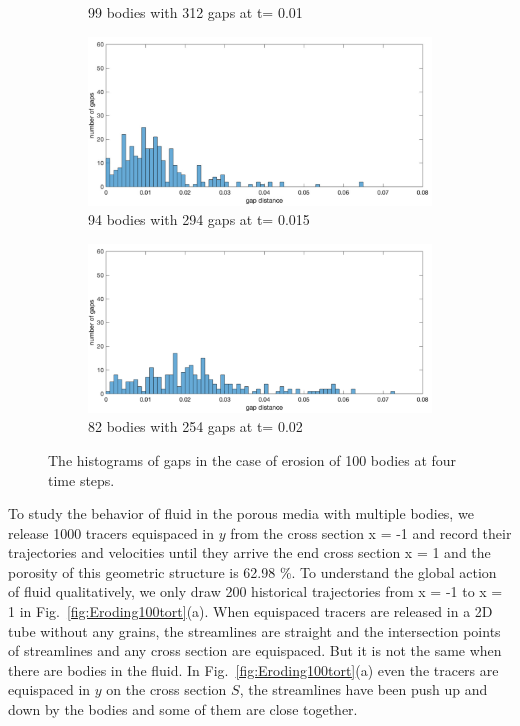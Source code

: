 \documentclass[preprint, 10pt]{elsarticle}
\begin{document}
{\begin{figure}[H]
\begin{subfigure}[b]{0.5\textwidth}
\caption{99 bodies with 312 gaps at t= 0.01}
\end{subfigure}
\begin{subfigure}[b]{0.5\textwidth}
\includegraphics*[width =\linewidth]{./figs/gap_hist100_150}
\caption{94 bodies with 294 gaps at t= 0.015}
\end{subfigure}%
\begin{subfigure}[b]{0.5\textwidth}
\includegraphics*[width =\linewidth]{./figs/gap_hist100_200}
\caption{82 bodies with 254 gaps at t= 0.02}
\end{subfigure}
\caption{\label{fig:Eroding100gap} The histograms of gaps in the case of erosion of 100 bodies at four time steps.}
\end{figure}

To study the behavior of fluid in the porous media with multiple bodies, 
we release 1000 tracers equispaced in $y$ from the 
cross section x = -1 and record their trajectories and velocities
until they arrive the end cross section x = 1 
and the porosity of this geometric structure is 62.98 \%. 
To understand the global action of fluid qualitatively, 
we only draw 200 historical trajectories from x = -1 to x = 1 
in Fig.~\ref{fig:Eroding100tort}(a). 
When equispaced tracers are released in a 2D tube without any grains, 
the streamlines are straight 
and the intersection points of streamlines and any cross section are equispaced. 
But it is not the same when there are bodies in the fluid. 
In Fig.~\ref{fig:Eroding100tort}(a)
even the tracers are equispaced in $y$ on the cross section $S$, 
the streamlines have been push up and down by the bodies and
some of them are close together. 




}
\end{document}

